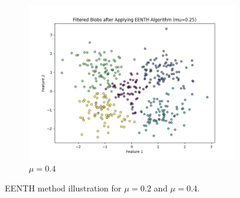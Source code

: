 \begin{figure}[ht]
\begin{subfigure}[b]{0.3\textwidth}
		\includegraphics[width=\textwidth]{figures/eenth/filtered_blobs_mu_0.25}
		\caption{$\mu = 0.4$}
		\label{fig:mu0.4}
	\end{subfigure}
	\caption{EENTH method illustration for $\mu = 0.2$ and $\mu = 0.4$.}
	\label{fig:mu_variation_1}
\end{figure}

